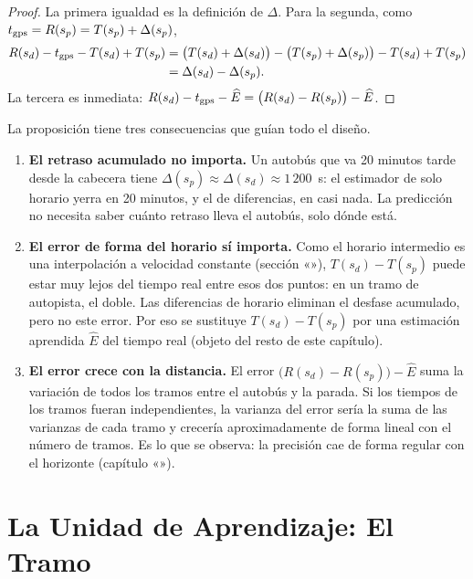 \begin{proof}
La primera igualdad es la definición de $\Delta$. Para la segunda, como $t_{\mathrm{gps}}=R(s_p)=T(s_p)+\Delta(s_p)$,
\begin{align*}
R(s_d)-t_{\mathrm{gps}}-T(s_d)+T(s_p)&=\big(T(s_d)+\Delta(s_d)\big)-\big(T(s_p)+\Delta(s_p)\big)-T(s_d)+T(s_p)\\
&=\Delta(s_d)-\Delta(s_p).
\end{align*}
La tercera es inmediata: $R(s_d)-t_{\mathrm{gps}}-\widehat E=\big(R(s_d)-R(s_p)\big)-\widehat E$.
\end{proof}

La proposición tiene tres consecuencias que guían todo el diseño.

\begin{enumerate}
  \item \textbf{El retraso acumulado no importa.} Un autobús que va 20 minutos tarde desde la cabecera tiene
        $\Delta(s_p)\approx\Delta(s_d)\approx1\,200$~s: el estimador de solo horario yerra en 20 minutos, y el de
        diferencias, en casi nada. La predicción no necesita saber cuánto retraso lleva el autobús, solo dónde está.
  \item \textbf{El error de forma del horario sí importa.} Como el horario intermedio es una interpolación a velocidad
        constante (sección «»), $T(s_d)-T(s_p)$ puede estar muy lejos del tiempo real entre
        esos dos puntos: en un tramo de autopista, el doble. Las diferencias de horario eliminan el desfase acumulado, pero no
        este error. Por eso se sustituye $T(s_d)-T(s_p)$ por una estimación aprendida $\widehat E$ del tiempo real
        (objeto del resto de este capítulo).
  \item \textbf{El error crece con la distancia.} El error $\big(R(s_d)-R(s_p)\big)-\widehat E$ suma la variación de
        todos los tramos entre el autobús y la parada. Si los tiempos de los tramos fueran independientes, la varianza
        del error sería la suma de las varianzas de cada tramo y crecería aproximadamente de forma lineal con el número
        de tramos. Es lo que se observa: la precisión cae de forma regular con el horizonte (capítulo
        «»).
\end{enumerate}

\section{La Unidad de Aprendizaje: El Tramo}
\label{sec:unidad-tramo}

